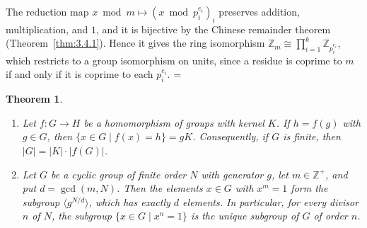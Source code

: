 \documentclass[11pt]{article}
\makeatletter
\theoremstyle{ntstyle}
\newtheorem{theorem}{Theorem}[subsection]
\newcommand{\statementitems}{\mbox{}}
\let\nt@closedisplay\]
\def\nt@guardedclose{\@ifnextchar\par{\nt@closeafterpar}{\@ifnextchar\end{\postdisplaypenalty\@M\nt@closedisplay}{\nt@closedisplay}}}
\def\nt@closeafterpar\par{\@ifnextchar\par{\nt@closeafterpar}{\@ifnextchar\end{\postdisplaypenalty\@M\nt@closedisplay\par}{\nt@closedisplay\par}}}
\renewenvironment{proof}[1][\proofname]{\par
  \pushQED{\qed}\normalfont\topsep\medskipamount\edef\nt@afterproof{\@endparpenalty=\the\@endparpenalty\relax}\@beginparpenalty\@M\@endparpenalty\@M\let\]\nt@guardedclose\trivlist\item[]\textit{#1\@addpunct{.}} \ignorespaces}{\ifvmode\addpenalty\@M\fi\popQED\nt@afterproof\endtrivlist\@endpefalse}
\makeatother
\begin{document}
\begin{proof} The reduction map $x\bmod m\mapsto(x\bmod p_i^{e_i})_{i}$ preserves
	addition, multiplication, and $1$, and it is bijective by the Chinese
	remainder theorem (Theorem~\ref{thm:3.4.1}). Hence it gives the ring
	isomorphism $\mathbb{Z}_m \cong \prod_{i=1}^{k}\mathbb{Z}_{p_i^{e_i}}$,
	which restricts to a group isomorphism on units, since a residue is
	coprime to $m$ if and only if it is coprime to each $p_i^{e_i}$.
\end{proof}
\begin{theorem}\label{thm:6.6.5}\statementitems

	\begin{enumerate}[label={\alph*)}]
		\item Let $f:G\to H$ be a homomorphism of groups with kernel $K$. If
					$h=f(g)$ with $g\in G$, then $\{x\in G\mid f(x)=h\}=gK$.
					Consequently, if $G$ is finite, then $|G|=|K|\cdot|f(G)|$.
		\item Let $G$ be a cyclic group of finite order $N$ with generator $g$,
					let $m\in\mathbb{Z}^+$, and put $d=\gcd(m,N)$. Then the elements
					$x\in G$ with $x^m=1$ form the subgroup $\langle g^{N/d}\rangle$,
					which has exactly $d$ elements. In particular, for every divisor $n$
					of $N$, the subgroup $\{x\in G\mid x^n=1\}$ is the unique subgroup of
					$G$ of order $n$.
	\end{enumerate}
\end{theorem}
\end{document}
